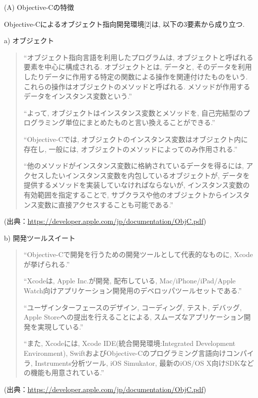 \begin{description}
\item (A) Objective-Cの特徴

Objective-Cによるオブジェクト指向開発環境[2]は, 以下の3要素から成り立つ.

\begin{description}
\item a) オブジェクト

\begin{quotation}
\begin{screen}
“オブジェクト指向言語を利用したプログラムは, オブジェクトと呼ばれる要素を中心に構成される.
オブジェクトとは, データと, そのデータを利用したりデータに作用する特定の関数による操作を関連付けたものをいう.
これらの操作はオブジェクトのメソッドと呼ばれる.
メソッドが作用するデータをインスタンス変数という.”

“よって, オブジェクトはインスタンス変数とメソッドを, 自己完結型のプログラミング単位にまとめたものと言い換えることができる.”

“Objective-Cでは, オブジェクトのインスタンス変数はオブジェクト内に存在し, 一般には, オブジェクトのメソッドによってのみ作用される.”

“他のメソッドがインスタンス変数に格納されているデータを得るには, アクセスしたいインスタンス変数を内包しているオブジェクトが, データを提供するメソッドを実装していなければならないが, インスタンス変数の有効範囲を指定することで, サブクラスや他のオブジェクトからインスタンス変数に直接アクセスすることも可能である.”
\end{screen}
\end{quotation}
\begin{flushright}
(出典：\url{https://developer.apple.com/jp/documentation/ObjC.pdf})
\end{flushright}

\item b) 開発ツールスイート

\begin{quotation}
\begin{screen}
“Objective-Cで開発を行うための開発ツールとして代表的なものに, Xcodeが挙げられる.”

“Xcodeは, Apple Inc.が開発, 配布している, Mac/iPhone/iPad/Apple Watch向けアプリケーション開発用のデベロッパツールセットである.”

“ユーザインターフェースのデザイン, コーディング, テスト, デバッグ, Apple Storeへの提出を行えることによる, スムーズなアプリケーション開発を実現している.”

“また, Xcodeには, Xcode IDE(統合開発環境:Integrated Development Environment), SwiftおよびObjective-Cのプログラミング言語向けコンパイラ, Instruments分析ツール, iOS Simukator, 最新のiOS/OS X向けSDKなどの機能も用意されている.”
\end{screen}
\end{quotation}
\begin{flushright}
(出典：\url{https://developer.apple.com/jp/documentation/ObjC.pdf})
\end{flushright}


\end{description}
\end{description}
